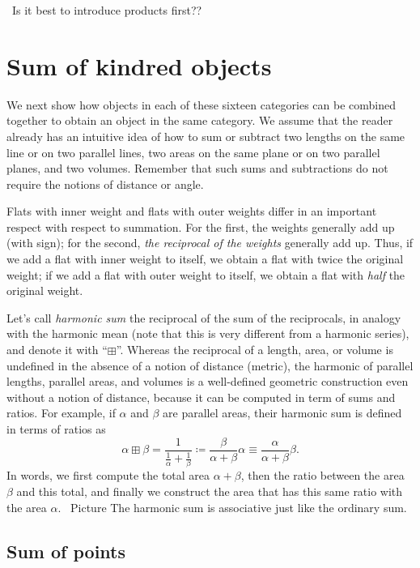 \documentclass[\ifafour a4paper,12pt,\else a5paper,10pt,\fi%
onecolumn,oneside,article,%
british%
]{memoir}
\theoremstyle{remark}
\theoremstyle{innote}
\newcommand*{\defd}{\coloneqq}
\renewcommand*{\|}{\nonscript\,\vert\nonscript\;\mathopen{}}
\newcommand*{\puzzle}{{\fontencoding{U}\fontfamily{fontawesometwo}\selectfont\symbol{225}}}
\newcommand{\mynote}[1]{ {\color{notecolour}\puzzle\ #1}}
\newcommand*{\+}{\boxplus}
\newcommand*{\yal}{\alpha}
\newcommand*{\ybe}{\beta}
\begin{document}
\mynote{Is it best to introduce products first??}

\section{Sum of kindred objects}
\label{sec:sum_kindred}

We next show how objects in each of these sixteen categories can be
combined together to obtain an object in the same category. We assume that
the reader already has an intuitive idea of how to sum or subtract two
lengths on the same line or on two parallel lines, two areas on the same
plane or on two parallel planes, and two volumes. Remember that such sums
and subtractions do not require the notions of distance or angle.

Flats with inner weight and flats with outer weights differ in an important
respect with respect to summation. For the first, the weights generally add
up (with sign); for the second, \emph{the reciprocal of the weights}
generally add up. Thus, if we add a flat with inner
weight to itself, we obtain a flat with twice the original weight; if we
add a flat with outer weight to itself, we obtain a flat with \emph{half}
the original weight.

Let's call \emph{harmonic sum} the reciprocal of the sum of the
reciprocals, in analogy with the harmonic mean (note that this is very
different from a harmonic series), and denote it with \enquote{$\+$}.
Whereas the reciprocal of a length, area, or volume is undefined in the
absence of a notion of distance (metric), the harmonic of parallel lengths,
parallel areas, and volumes is a well-defined geometric construction even
without a notion of distance, because it can be computed in term of sums
and ratios. For example, if $\yal$ and $\ybe$ are parallel areas, their
harmonic sum is defined in terms of ratios as
\begin{equation}
  \label{eq:reciprocal_sum}
\yal \+ \ybe =  \frac{1}{\frac{1}{\yal}+ \frac{1}{\ybe}} \defd
  \frac{\ybe}{\yal+\ybe}\yal \equiv
  \frac{\yal}{\yal+\ybe}\ybe.
\end{equation}
In words, we first compute the total area $\yal+\ybe$, then the ratio
between the area $\ybe$ and this total, and finally we construct the area
that has this same ratio with the area $\yal$. \mynote{Picture} The
harmonic sum is associative just like the ordinary sum.


\subsection{Sum of points}
\label{sec:sum_points}
\end{document}
